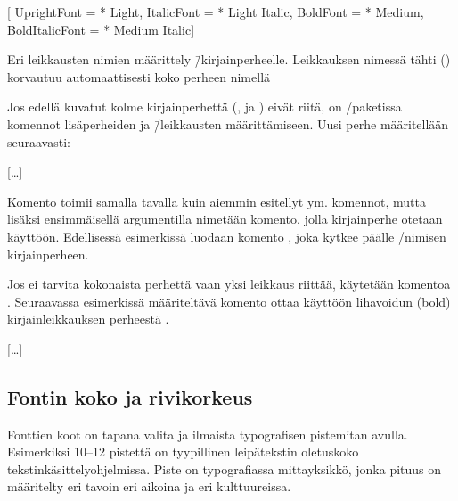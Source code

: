 \begin{esimerkki*}
\begin{koodilohko}
\setmainfont{Macklin Text}[
  UprightFont    = {* Light},
  ItalicFont     = {* Light Italic},
  BoldFont       = {* Medium},
  BoldItalicFont = {* Medium Italic}]
\end{koodilohko}
  \caption{Eri leikkausten nimien määrittely 
    \=/kirjainperheelle. Leikkauksen nimessä tähti (\koodi{*}) korvautuu
    automaattisesti koko perheen nimellä}
  \label{esim/fontit-leik-omin-käyt}
\end{esimerkki*}

Jos edellä kuvatut kolme kirjainperhettä (,
 ja ) eivät riitä, on
\-/paketissa komennot lisäperheiden ja \=/leikkausten
määrittämiseen. Uusi perhe määritellään seu\-raa\-vasti:

\begin{koodilohkosis}
[…]
\end{koodilohkosis}

\noindent
Komento  toimii samalla tavalla kuin aiemmin
esitellyt  ym. komennot, mutta lisäksi
ensimmäisellä argumentilla nimetään komento, jolla kirjainperhe otetaan
käyttöön. Edellisessä esimerkissä luodaan komento
, joka kytkee päälle 
\=/nimisen kirjainperheen.

Jos ei tarvita kokonaista perhettä vaan yksi leikkaus riittää, käytetään
komentoa . Seuraavassa esimerkissä määriteltävä
komento  ottaa käyttöön lihavoidun (bold)
kirjainleikkauksen perheestä .

\begin{koodilohkosis}
[…]
\end{koodilohkosis}

\subsection{Fontin koko ja rivikorkeus}

Fonttien koot on tapana valita ja ilmaista typografisen pistemitan
avulla. Esimerkiksi 10--12 pistettä on tyypillinen leipätekstin
oletuskoko tekstinkäsittelyohjelmissa. Piste on typografiassa
mittayksikkö, jonka pituus on määritelty eri tavoin eri aikoina ja eri
kulttuureissa.


